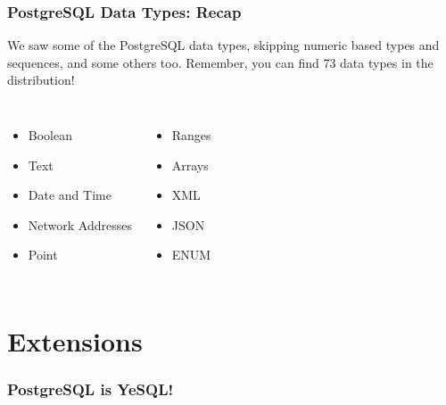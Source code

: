 \documentclass[xcolor=dvipsnames]{beamer}
\begin{document}
\begin{frame}[fragile]
  \frametitle{PostgreSQL Data Types: Recap}

  We saw some of the PostgreSQL data types, skipping numeric based types and
  sequences, and some others too. Remember, you can find 73 data types in
  the distribution!

  \vfill

  \begin{columns}[c]
    \begin{itemize}
    \item Boolean
    \item Text
    \item Date and Time
    \item Network Addresses
    \item Point
    \end{itemize}

    \begin{itemize}
    \item Ranges
    \item Arrays
    \item XML
    \item JSON
    \item ENUM
    \end{itemize}
  \end{columns}
\end{frame}


\section{Extensions}

{
 
  \begin{frame}
    \frametitle{PostgreSQL is YeSQL!}

  \end{frame}
}
\end{document}
